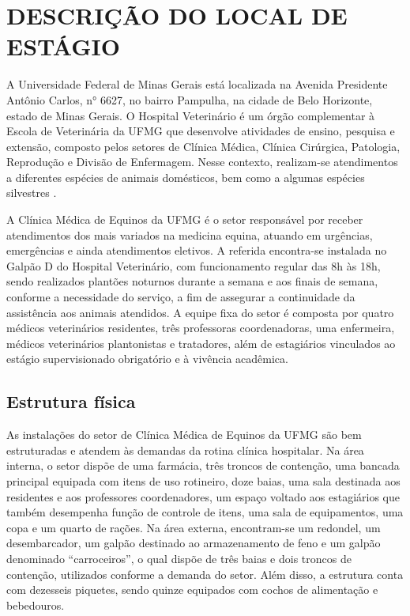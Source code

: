 \chapter{DESCRIÇÃO DO LOCAL DE ESTÁGIO}
\label{cap:local}

A Universidade Federal de Minas Gerais está localizada na Avenida
Presidente Antônio Carlos, n° 6627, no bairro Pampulha, na cidade de
Belo Horizonte, estado de Minas Gerais. O Hospital Veterinário é um
órgão complementar à Escola de Veterinária da UFMG que desenvolve
atividades de ensino, pesquisa e extensão, composto pelos setores de
Clínica Médica, Clínica Cirúrgica, Patologia, Reprodução e Divisão de
Enfermagem. Nesse contexto, realizam-se atendimentos a diferentes
espécies de animais domésticos, bem como a algumas espécies silvestres
\cite{UFMG2026}.

A Clínica Médica de Equinos da UFMG é o setor responsável por receber
atendimentos dos mais variados na medicina equina, atuando em urgências,
emergências e ainda atendimentos eletivos. A referida encontra-se
instalada no Galpão D do Hospital Veterinário, com funcionamento regular
das 8h às 18h, sendo realizados plantões noturnos durante a semana e aos
finais de semana, conforme a necessidade do serviço, a fim de assegurar
a continuidade da assistência aos animais atendidos. A equipe fixa do
setor é composta por quatro médicos veterinários residentes, três
professoras coordenadoras, uma enfermeira, médicos veterinários
plantonistas e tratadores, além de estagiários vinculados ao estágio
supervisionado obrigatório e à vivência acadêmica.

\section{Estrutura física}
\label{sec:estrutura}

As instalações do setor de Clínica Médica de Equinos da UFMG são bem
estruturadas e atendem às demandas da rotina clínica hospitalar. Na área
interna, o setor dispõe de uma farmácia, três troncos de contenção, uma
bancada principal equipada com itens de uso rotineiro, doze baias, uma
sala destinada aos residentes e aos professores coordenadores, um espaço
voltado aos estagiários que também desempenha função de controle de
itens, uma sala de equipamentos, uma copa e um quarto de rações. Na área
externa, encontram-se um redondel, um desembarcador, um galpão destinado
ao armazenamento de feno e um galpão denominado ``carroceiros'', o qual
dispõe de três baias e dois troncos de contenção, utilizados conforme a
demanda do setor. Além disso, a estrutura conta com dezesseis piquetes,
sendo quinze equipados com cochos de alimentação e bebedouros.

